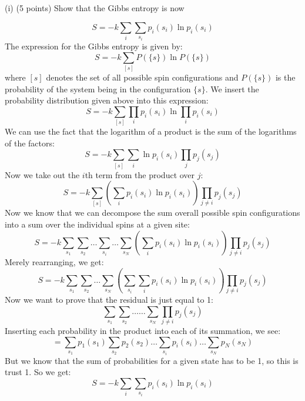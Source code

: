 \documentclass[12pt]{article}
\begin{document}
\subsection{}
(i) (5 points) Show that the Gibbs entropy is now


\begin{equation*}
S=-k \sum_{i} \sum_{s_{i}} p_{i}\left(s_{i}\right) \ln p_{i}\left(s_{i}\right) \tag{1}
\end{equation*}
The expression for the Gibbs entropy is given by:
\begin{equation}
S=-k \sum_{[s] } P(\{s\}) \ln P(\{s\})
\end{equation}
where $[s]$ denotes the set of all possible spin configurations and $P(\{s\})$ is the probability of the system being in the configuration $\{s\}$.
We insert the probability distribution given above into this expression:
\begin{equation}
S=-k \sum_{[s] } \prod_{i} p_{i}\left(s_{i}\right) \ln \prod_{i} p_{i}\left(s_{i}\right)
\end{equation}
We can use the fact that the logarithm of a product is the sum of the logarithms of the factors:
\begin{equation}
S=-k \sum_{[s] } \sum_{i} \ln p_{i}\left(s_{i}\right) \prod_{j} p_{j}\left(s_{j}\right)
\end{equation}
Now we take out the $i$th term from the product over $j$:
\begin{equation}
S=-k \sum_{[s] } (\sum_{i} p_{i}\left(s_{i}\right)\ln p_{i}\left(s_{i}\right)) \prod_{j\neq i} p_{j}\left(s_{j}\right)
\end{equation}
Now we know that we can decompose the sum overall possible spin configurations into a sum over the individual spins at a given site:
\begin{equation}
S=-k \sum_{s_1} \sum_{s_2} \ldots \sum_{s_i} \ldots \sum_{s_N} (\sum_{i} p_{i}\left(s_{i}\right)\ln p_{i}\left(s_{i}\right)) \prod_{j\neq i} p_{j}\left(s_{j}\right) 
\end{equation}
Merely rearranging, we get:
\begin{equation}
S=-k \sum_{s_1} \sum_{s_2} \ldots \sum_{s_N} (\sum_{s_i} \sum_{i} p_{i}\left(s_{i}\right)\ln p_{i}\left(s_{i}\right)) \prod_{j\neq i} p_{j}\left(s_{j}\right) 
\end{equation}
Now we want to prove that the residual is just equal to 1:
\begin{equation}
\sum_{s_1} \sum_{s_2} \ldots \ldots \sum_{s_N} \prod_{j\neq i} p_{j}\left(s_{j}\right)  
\end{equation}
Inserting each probability in the product into each of its summation, we see:
\begin{equation}
=\sum_{s_1} p_{1}\left(s_{1}\right) \sum_{s_2} p_{2}\left(s_{2}\right) \ldots \sum_{s_i} p_{i}\left(s_{i}\right) \ldots \sum_{s_N} p_{N}\left(s_{N}\right)
\end{equation}
But we know that the sum of probabilities for a given state has to be 1, so this is trust 1. So we get:
\begin{equation}
S=-k \sum_{i} \sum_{s_{i}} p_{i}\left(s_{i}\right) \ln p_{i}\left(s_{i}\right)
\end{equation}
\end{document}
